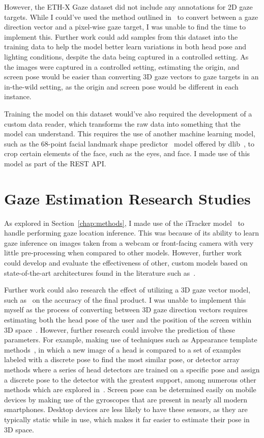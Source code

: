 \documentclass{report}
\begin{document}
However, the ETH-X Gaze dataset did not include any annotations for 2D gaze targets. While I could've used the method outlined in~\cite{zhang15cvpr} to convert between a gaze direction vector and a pixel-wise gaze target, I was unable to find the time to implement this. Further work could add samples from this dataset into the training data to help the model better learn variations in both head pose and lighting conditions, despite the data being captured in a controlled setting. As the images were captured in a controlled setting, estimating the origin, and screen pose would be easier than converting 3D gaze vectors to gaze targets in an in-the-wild setting, as the origin and screen pose would be different in each instance. 

Training the model on this dataset would've also required the development of a custom data reader, which transforms the raw data into something that the model can understand. This requires the use of another machine learning model, such as the 68-point facial landmark shape predictor~\cite{king2015models} model offered by dlib~\cite{king2009dlib}, to crop certain elements of the face, such as the eyes, and face. I made use of this model as part of the REST API.

\section{Gaze Estimation Research Studies}

As explored in Section~\ref{chap:methods}, I made use of the iTracker model~\cite{krafka2016eye} to handle performing gaze location inference. This was because of its ability to learn gaze inference on images taken from a webcam or front-facing camera with very little pre-processing when compared to other models. However, further work could develop and evaluate the effectiveness of other, custom models based on state-of-the-art architectures found in the literature such as~\cite{seonwook2019fewshot,tafasca2023sharingan}. 

Further work could also research the effect of utilizing a 3D gaze vector model, such as~\cite{zaho2024gazeswin,yu2019deep} on the accuracy of the final product. I was unable to implement this myself as the process of converting between 3D gaze direction vectors requires estimating both the head pose of the user and the position of the screen within 3D space~\cite{zhang15cvpr}. However, further research could involve the prediction of these parameters. For example, making use of techniques such as Appearance template methods~\cite{niyogi1996example}, in which a new image of a head is compared to a set of examples labeled with a discrete pose to find the most similar pose, or detector array methods where a series of head detectors are trained on a specific pose and assign a discrete pose to the detector with the greatest support, among numerous other methods which are explored in~\cite{chutorian2009head}. Screen pose can be determined easily on mobile devices by making use of the gyroscopes that are present in nearly all modern smartphones. Desktop devices are less likely to have these sensors, as they are typically static while in use, which makes it far easier to estimate their pose in 3D space.
\end{document}
